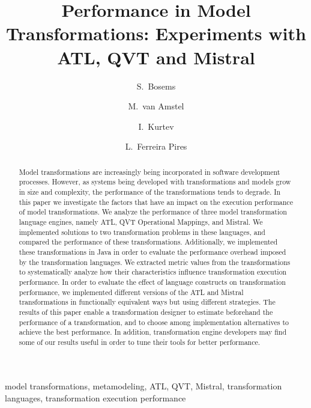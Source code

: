 \documentclass[12pt]{elsarticle}
\begin{document}
\begin{frontmatter}

\title{Performance in Model Transformations: Experiments with ATL, QVT and
Mistral}

\author[ut]{S.~Bosems}

\author[tue]{M.~van Amstel}
\author[ut]{I.~Kurtev}
\author[ut]{L.~Ferreira Pires}


\address[ut]{Faculty of Electrical Engineering, Mathematics and Computer
Science, University of Twente, Drienerlolaan 5, 7522NB, Enschede, The
Netherlands}
\address[tue]{Department of Mathematics and Computer Science, Eindhoven
University of Technology, Den Dolesch 2, 5612AZ, Eindhoven, The Netherlands}

\begin{abstract}
Model transformations are increasingly being incorporated in software development
processes. However, as systems being developed with transformations and models
grow in size and complexity, the performance of the transformations tends to
degrade. In this paper we investigate the factors that have an impact on the execution performance
of model transformations. We analyze the performance of three model
transformation language engines, namely ATL, QVT Operational Mappings, and Mistral. We implemented solutions to two transformation problems
in these languages, and compared the performance of these transformations.
Additionally, we implemented these transformations in Java in order to
evaluate the performance overhead imposed by the transformation languages. We extracted metric values from the transformations to systematically analyze how their 
characteristics influence transformation execution performance. In order to
evaluate the effect of language constructs on transformation performance, we
implemented different versions of the ATL and Mistral transformations
in functionally equivalent ways but using different strategies. 
The results of this paper enable a transformation designer to estimate beforehand the
performance of a transformation, and to choose among implementation alternatives to
achieve the best performance. In addition, transformation engine developers may find some
of our results useful in order to tune their tools for better performance.
\end{abstract}

\begin{keyword}model transformations, metamodeling, ATL, QVT, Mistral,
transformation languages, transformation execution performance\end{keyword}
\end{frontmatter}
\end{document}
